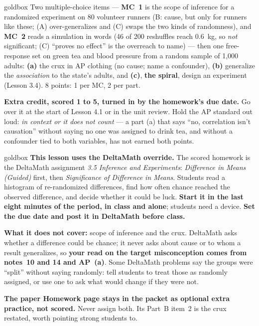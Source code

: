 \documentclass[10pt]{article}
\begin{document}
\boxguard
\begin{skillbox}{goldbox}
Two multiple-choice items --- \textbf{MC~1} is the scope of inference for a randomized
experiment on 80 volunteer runners (B: cause, but only for runners like these; (A)
over-generalizes and (C) swaps the two kinds of randomness), and \textbf{MC~2} reads a
simulation in words (46 of 200 reshuffles reach 0.6~kg, so \emph{not} significant; (C) ``proves
no effect'' is the overreach to name) --- then one free-response set on green tea and blood
pressure from a random sample of 1{,}000 adults: \textbf{(a)} the crux in AP clothing (no
cause; name a confounder), \textbf{(b)} generalize the \emph{association} to the state's adults,
and \textbf{(c)}, \textbf{the spiral}, design an experiment (Lesson 3.4). 8 points: 1 per MC,
2 per part.

\textbf{Extra credit, scored 1 to 5, turned in by the homework's due date.} Go over it at the start of
Lesson 4.1 or in the unit review. Hold the AP standard out loud: \emph{in context or it does
not count} --- a part (a) that says ``no, correlation isn't causation'' without saying no one
was assigned to drink tea, and without a confounder tied to both variables, has not earned
both points.
\end{skillbox}

\boxguard
\begin{skillbox}{goldbox}
\textbf{This lesson uses the DeltaMath override.} The scored homework is the DeltaMath assignment
\emph{3.5 Inference and Experiments}: \emph{Difference in Means (Guided)} first, then
\emph{Significance of Difference in Means}. Students read a histogram of re-randomized
differences, find how often chance reached the observed difference, and decide whether it could
be luck. \textbf{Start it in the last eight minutes of the period, in class and alone}; students
need a device. \textbf{Set the due date and post it in DeltaMath before class.}

\textbf{What it does not cover:} scope of inference and the crux. DeltaMath asks whether a
difference could be chance; it never asks about cause or to whom a result generalizes, so
\textbf{your read on the target misconception comes from notes~10 and 14 and AP~(a)}. Some
DeltaMath problems say the groups were ``split'' without saying randomly: tell students to treat
those as randomly assigned, or use one to ask what would change if they were not.

\textbf{The paper Homework page stays in the packet as optional extra practice, not scored.}
Never assign both. Its Part~B item~2 is the crux restated, worth pointing strong students to.
\end{skillbox}
\end{document}
